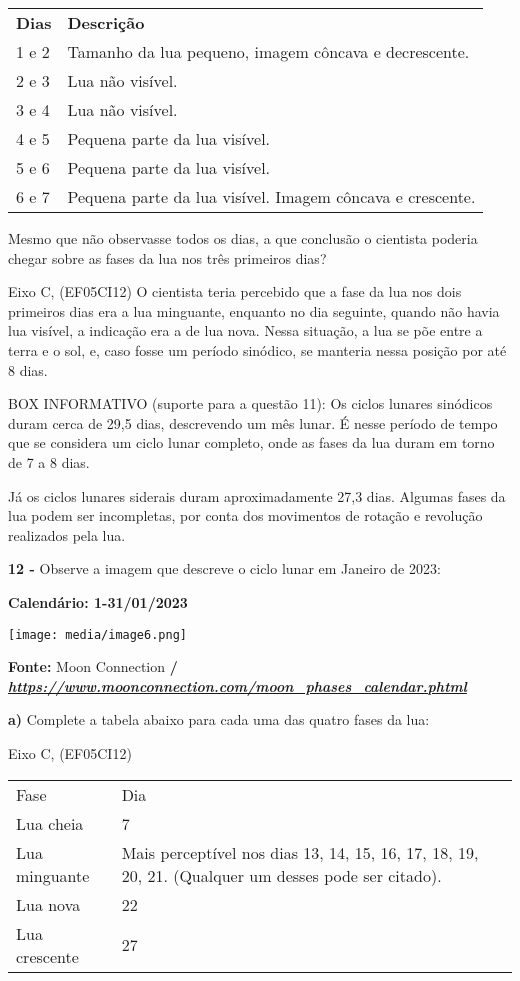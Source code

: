 \begin{longtable}[]{@{}ll@{}}
\toprule
\textbf{Dias} & \textbf{Descrição}\tabularnewline
1 e 2 & Tamanho da lua pequeno, imagem côncava e
decrescente.\tabularnewline
2 e 3 & Lua não visível.\tabularnewline
3 e 4 & Lua não visível.\tabularnewline
4 e 5 & Pequena parte da lua visível.\tabularnewline
5 e 6 & Pequena parte da lua visível.\tabularnewline
6 e 7 & Pequena parte da lua visível. Imagem côncava e
crescente.\tabularnewline
\bottomrule
\end{longtable}

Mesmo que não observasse todos os dias, a que conclusão o cientista
poderia chegar sobre as fases da lua nos três primeiros dias?

Eixo C, (EF05CI12) O cientista teria percebido que a fase da lua nos
dois primeiros dias era a lua minguante, enquanto no dia seguinte,
quando não havia lua visível, a indicação era a de lua nova. Nessa
situação, a lua se põe entre a terra e o sol, e, caso fosse um período
sinódico, se manteria nessa posição por até 8 dias.

BOX INFORMATIVO (suporte para a questão 11): Os ciclos lunares sinódicos
duram cerca de 29,5 dias, descrevendo um mês lunar. É nesse período de
tempo que se considera um ciclo lunar completo, onde as fases da lua
duram em torno de 7 a 8 dias.

Já os ciclos lunares siderais duram aproximadamente 27,3 dias. Algumas
fases da lua podem ser incompletas, por conta dos movimentos de rotação
e revolução realizados pela lua.

\textbf{12 -} Observe a imagem que descreve o ciclo lunar em Janeiro de
2023:

\textbf{Calendário: 1-31/01/2023}

\texttt{[image: media/image6.png]}

\textbf{Fonte:} Moon Connection \textbf{/
\href{https://www.moonconnection.com/moon_phases_calendar.phtml}{\emph{https://www.moonconnection.com/moon\_phases\_calendar.phtml}}}

\textbf{a)} Complete a tabela abaixo para cada uma das quatro fases da
lua:

Eixo C, (EF05CI12)

\begin{longtable}[]{@{}ll@{}}
\toprule
Fase & Dia\tabularnewline
Lua cheia & 7\tabularnewline
Lua minguante & Mais perceptível nos dias 13, 14, 15, 16, 17, 18, 19,
20, 21. (Qualquer um desses pode ser citado).\tabularnewline
Lua nova & 22\tabularnewline
Lua crescente & 27\tabularnewline
\bottomrule
\end{longtable}

